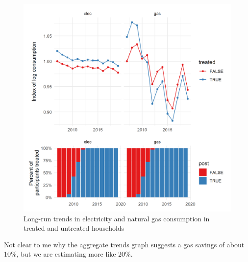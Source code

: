 \documentclass{article}
\begin{document}
\begin{figure}
	\includegraphics{../output_figures_tables/aggregate_trend_graph}
	\caption{Long-run trends in electricity and natural gas consumption in treated and untreated households}\label{fig_agg}
\end{figure}

{\color{red} Not clear to me why the aggregate trends graph suggests a gas savings of about 10\%, but we are estimating more like 20\%.}
\end{document}

